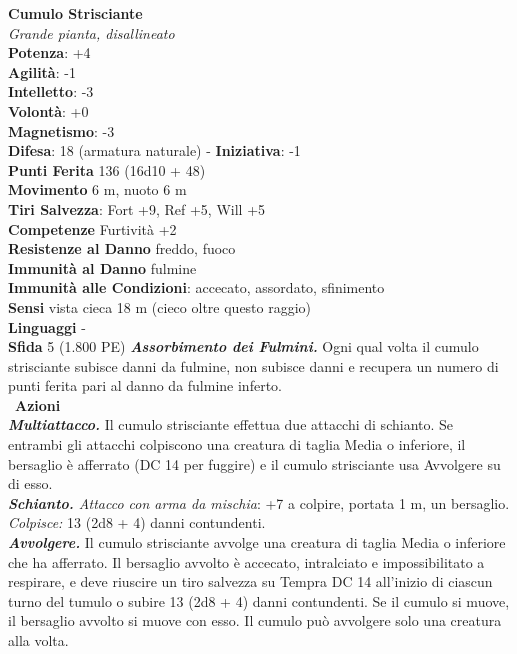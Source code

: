 \begin{multicols}{2}
\medskip\textbf{Cumulo Strisciante}\\
\emph{Grande pianta, disallineato}\\
\textbf{Potenza}: +4\\
\textbf{Agilità}: -1\\
\textbf{Intelletto}: -3\\
\textbf{Volontà}: +0\\
\textbf{Magnetismo}: -3\\
\textbf{Difesa}: 18 (armatura naturale) - \textbf{Iniziativa}: -1\\
\textbf{Punti Ferita} 136 (16d10 + 48)\\
\textbf{Movimento} 6 m, nuoto 6 m\\
\textbf{Tiri Salvezza}: Fort +9, Ref +5, Will +5\\
\textbf{Competenze} Furtività +2\\
\textbf{Resistenze al Danno} freddo, fuoco\\
\textbf{Immunità al Danno} fulmine\\
\textbf{Immunità alle Condizioni}: accecato, assordato, sfinimento\\
\textbf{Sensi} vista cieca 18 m (cieco oltre questo raggio)\\
\textbf{Linguaggi} -\\
\textbf{Sfida} 5 (1.800 PE)\smallskip
\emph{\textbf{Assorbimento dei Fulmini.}} Ogni qual volta il cumulo strisciante subisce danni da fulmine, non subisce danni e recupera un numero di punti ferita pari al danno da fulmine inferto.\\\
\smallskip\textbf{Azioni}\\
\emph{\textbf{Multiattacco.}} Il cumulo strisciante effettua due attacchi di schianto. Se entrambi gli attacchi colpiscono una creatura di taglia Media o inferiore, il bersaglio è afferrato (DC 14 per fuggire) e il cumulo strisciante usa Avvolgere su di esso.\\
\emph{\textbf{Schianto.} Attacco con arma da mischia}: +7 a colpire, portata 1 m, un bersaglio.\\
\emph{Colpisce:} 13 (2d8 + 4) danni contundenti.\\
\emph{\textbf{Avvolgere.}} Il cumulo strisciante avvolge una creatura di taglia Media o inferiore che ha afferrato. Il bersaglio avvolto è accecato, intralciato e impossibilitato a respirare, e deve riuscire un tiro salvezza su Tempra DC 14 all'inizio di ciascun turno del tumulo o subire 13 (2d8 + 4) danni contundenti. Se il cumulo si muove, il bersaglio avvolto si muove con esso. Il cumulo può avvolgere solo una creatura alla volta.


\end{multicols}
